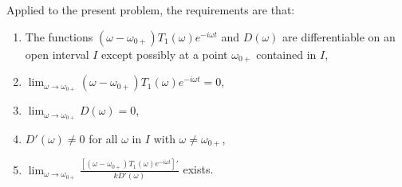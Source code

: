 \documentclass{aastex61}
\begin{document}
Applied to the present problem, the requirements are that:
\begin{enumerate}
	\item The functions $(\omega - \omega_{0+}) T_1(\omega) e^{-i\omega t}$ and $D(\omega)$ are differentiable on an open interval $I$ except possibly at a point $\omega_{0+}$ contained in $I$,
	\item $\lim_{\omega \to \omega_{0+}}(\omega - \omega_{0+}) T_1(\omega) e^{-i\omega t} = 0$,
	\item $\lim_{\omega \to \omega_{0+}}D(\omega) = 0$,
	\item $D'(\omega) \neq 0$ for all $\omega$ in $I$ with $\omega \neq \omega_{0+}$,
	\item $\lim_{\omega \to \omega_{0+}} \frac{[(\omega - \omega_{0+}) T_1(\omega) e^{-i\omega t}]'}{kD'(\omega)}$ exists.
\end{enumerate}
\end{document}
